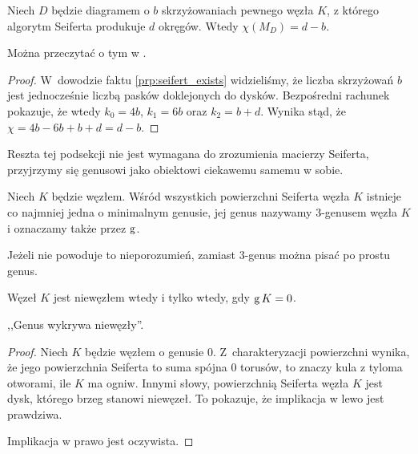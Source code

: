 \begin{proposition}
\label{prp:seifert_euler_characteristics}%
    Niech $D$ będzie diagramem o $b$ skrzyżowaniach pewnego węzła $K$, z którego algorytm Seiferta produkuje $d$ okręgów.
    Wtedy $\chi(M_D) = d - b$.
\end{proposition}

Można przeczytać o tym w \cite[s. 82]{murasugi1996}.

\begin{proof}
    W~dowodzie faktu \ref{prp:seifert_exists} widzieliśmy, że liczba skrzyżowań $b$ jest jednocześnie liczbą pasków doklejonych do dysków.
    Bezpośredni rachunek pokazuje, że wtedy $k_0 = 4b$, $k_1 = 6b$ oraz $k_2 = b+d$.
    Wynika stąd, że $\chi = 4b - 6b + b + d = d - b$.
\end{proof}

Reszta tej podsekcji nie jest wymagana do zrozumienia macierzy Seiferta, przyjrzymy się genusowi jako obiektowi ciekawemu samemu w sobie.

\begin{definition}[3-genus]
    Niech $K$ będzie węzłem.
    Wśród wszystkich powierzchni Seiferta węzła $K$ istnieje co najmniej jedna o minimalnym genusie, jej genus nazywamy 3-genusem węzła $K$ i oznaczamy także przez $\operatorname{g}$.
\end{definition}

Jeżeli nie powoduje to nieporozumień, zamiast 3-genus można pisać po prostu genus.

\begin{proposition}
\label{prp:genus_detects_unknot}%
    Węzeł $K$ jest niewęzłem wtedy i tylko wtedy, gdy $\operatorname{g} K = 0$.
\end{proposition}

,,Genus wykrywa niewęzły''.

\begin{proof}
    Niech $K$ będzie węzłem o genusie $0$.
    Z~charakteryzacji powierzchni wynika, że jego powierzchnia Seiferta to suma spójna $0$ torusów, to znaczy kula z tyloma otworami, ile $K$ ma ogniw.
    Innymi słowy, powierzchnią Seiferta węzła $K$ jest dysk, którego brzeg stanowi niewęzeł.
    To pokazuje, że implikacja w lewo jest prawdziwa.

    Implikacja w prawo jest oczywista.
\end{proof}









%


